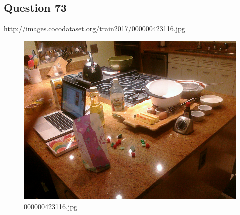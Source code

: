 \subsection*{Question 73}
http://images.cocodataset.org/train2017/000000423116.jpg
\begin{figure}[h]
    \centering
    \includegraphics[width=0.8\linewidth]{../image set/hard/000000423116.jpg}
    \caption{000000423116.jpg}
\end{figure}
